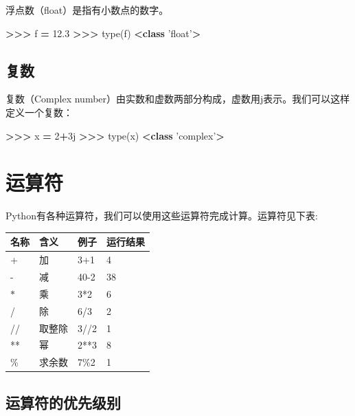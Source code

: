 \documentclass[]{ctexbook}
\newenvironment{Shaded}{\begin{snugshade}}{\end{snugshade}}
\newcommand{\BuiltInTok}[1]{#1}
\newcommand{\DecValTok}[1]{\textcolor[rgb]{0.00,0.00,0.81}{#1}}
\newcommand{\FloatTok}[1]{\textcolor[rgb]{0.00,0.00,0.81}{#1}}
\newcommand{\KeywordTok}[1]{\textcolor[rgb]{0.13,0.29,0.53}{\textbf{#1}}}
\newcommand{\NormalTok}[1]{#1}
\newcommand{\OperatorTok}[1]{\textcolor[rgb]{0.81,0.36,0.00}{\textbf{#1}}}
\newcommand{\StringTok}[1]{\textcolor[rgb]{0.31,0.60,0.02}{#1}}
\begin{document}
浮点数（float）是指有小数点的数字。

\begin{Shaded}
\begin{Highlighting}[]
\OperatorTok{>>>}\NormalTok{ f }\OperatorTok{=} \FloatTok{12.3}
\OperatorTok{>>>} \BuiltInTok{type}\NormalTok{(f)}
\OperatorTok{<}\KeywordTok{class} \StringTok{'float'}\OperatorTok{>}
\end{Highlighting}
\end{Shaded}

\hypertarget{ux590dux6570}{%
\subsection{复数}\label{ux590dux6570}}

复数（Complex number）由实数和虚数两部分构成，虚数用j表示。我们可以这样定义一个复数：

\begin{Shaded}
\begin{Highlighting}[]
\OperatorTok{>>>}\NormalTok{ x }\OperatorTok{=} \DecValTok{2}\OperatorTok{+}\NormalTok{3j}
\OperatorTok{>>>} \BuiltInTok{type}\NormalTok{(x)}
\OperatorTok{<}\KeywordTok{class} \StringTok{'complex'}\OperatorTok{>}
\end{Highlighting}
\end{Shaded}

\hypertarget{ux8fd0ux7b97ux7b26}{%
\section{运算符}\label{ux8fd0ux7b97ux7b26}}

Python有各种运算符，我们可以使用这些运算符完成计算。运算符见下表:

\begin{longtable}[]{@{}llll@{}}
\toprule
名称 & 含义 & 例子 & 运行结果\tabularnewline
\midrule
\endhead
+ & 加 & 3+1 & 4\tabularnewline
- & 减 & 40-2 & 38\tabularnewline
\(*\) & 乘 & 3*2 & 6\tabularnewline
/ & 除 & 6/3 & 2\tabularnewline
// & 取整除 & 3//2 & 1\tabularnewline
** & 幂 & 2**3 & 8\tabularnewline
\% & 求余数 & 7\%2 & 1\tabularnewline
\bottomrule
\end{longtable}

\hypertarget{ux8fd0ux7b97ux7b26ux7684ux4f18ux5148ux7ea7ux522b}{%
\subsection{运算符的优先级别}\label{ux8fd0ux7b97ux7b26ux7684ux4f18ux5148ux7ea7ux522b}}
\end{document}
